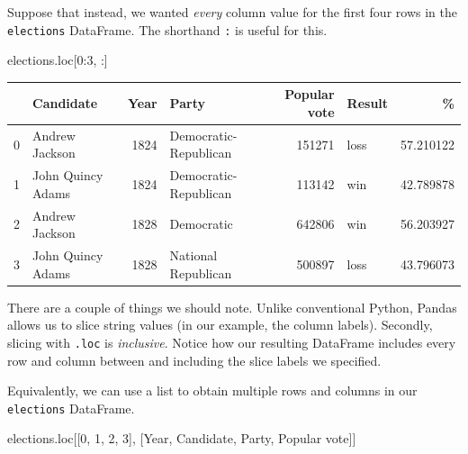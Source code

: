 \documentclass[
  letterpaper,
  DIV=11,
  numbers=noendperiod]{scrreprt}
\newenvironment{Shaded}{\begin{snugshade}}{\end{snugshade}}
\newcommand{\DecValTok}[1]{\textcolor[rgb]{0.68,0.00,0.00}{#1}}
\newcommand{\NormalTok}[1]{\textcolor[rgb]{0.00,0.23,0.31}{#1}}
\newcommand{\StringTok}[1]{\textcolor[rgb]{0.13,0.47,0.30}{#1}}
\begin{document}
Suppose that instead, we wanted \emph{every} column value for the first
four rows in the \texttt{elections} DataFrame. The shorthand \texttt{:}
is useful for this.

\begin{Shaded}
\begin{Highlighting}[]
\NormalTok{elections.loc[}\DecValTok{0}\NormalTok{:}\DecValTok{3}\NormalTok{, :]}
\end{Highlighting}
\end{Shaded}

\begin{tabular}{llrlrlr}
\toprule
{} &          Candidate &  Year &                  Party &  Popular vote & Result &          \% \\
\midrule
0 &     Andrew Jackson &  1824 &  Democratic-Republican &        151271 &   loss &  57.210122 \\
1 &  John Quincy Adams &  1824 &  Democratic-Republican &        113142 &    win &  42.789878 \\
2 &     Andrew Jackson &  1828 &             Democratic &        642806 &    win &  56.203927 \\
3 &  John Quincy Adams &  1828 &    National Republican &        500897 &   loss &  43.796073 \\
\bottomrule
\end{tabular}

There are a couple of things we should note. Unlike conventional Python,
Pandas allows us to slice string values (in our example, the column
labels). Secondly, slicing with \texttt{.loc} is \emph{inclusive}.
Notice how our resulting DataFrame includes every row and column between
and including the slice labels we specified.

Equivalently, we can use a list to obtain multiple rows and columns in
our \texttt{elections} DataFrame.

\begin{Shaded}
\begin{Highlighting}[]
\NormalTok{elections.loc[[}\DecValTok{0}\NormalTok{, }\DecValTok{1}\NormalTok{, }\DecValTok{2}\NormalTok{, }\DecValTok{3}\NormalTok{], [}\StringTok{\textquotesingle{}Year\textquotesingle{}}\NormalTok{, }\StringTok{\textquotesingle{}Candidate\textquotesingle{}}\NormalTok{, }\StringTok{\textquotesingle{}Party\textquotesingle{}}\NormalTok{, }\StringTok{\textquotesingle{}Popular vote\textquotesingle{}}\NormalTok{]]}
\end{Highlighting}
\end{Shaded}
\end{document}
